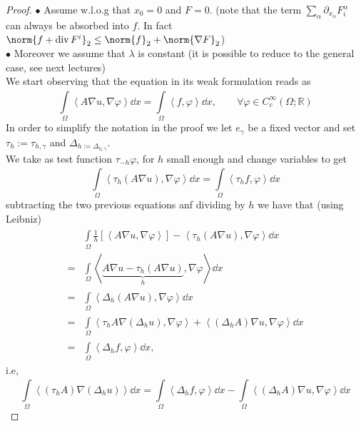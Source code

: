 \begin{proof}
	\( \bullet \)  Assume w.l.o.g that \( x_{0}=0 \) and \( F=0 \). (note that the term \( \sum_{\alpha }^{}\partial_{x_{\alpha }}F_{i}^{\alpha } \) can always be absorbed into \( f \). In fact \( \norm{f+ \operatorname{div}F^{i}}_{2}\leq \norm{f}_{2}+\norm{\nabla F}_{2} \))\\
	\( \bullet \)  Moreover we assume that \( \lambda \) is constant (it is possible to reduce to the general case, see next lectures) \\
	We start observing that the equation in its weak formulation reads as
	\[ \int\limits_{\Omega}^{} \left\langle A \nabla u, \nabla \varphi  \right\rangle  \dd{x} = \int\limits_{\Omega}^{} \left\langle f,\varphi  \right\rangle  \dd{x}, \qquad \forall  \varphi \in  C_{c}^{\infty }(\Omega ; \mathbb{R}) \]
	In order to simplify the notation in the proof we let \( e_{\gamma } \) be a fixed vector and set \( \tau _{h}:= \tau _{h, \gamma  } \) and \( \Delta _{h := \Delta _{h, \gamma }} \).\\
	We take as test function \( \tau _{-h}\varphi  \), for \( h \) small enough and change variables to get
	\[ \int\limits_{\Omega}^{} \left\langle \tau _{h}(A \nabla u), \nabla \varphi  \right\rangle  \dd{x} = \int\limits_{\Omega}^{} \left\langle \tau _{h}f, \varphi  \right\rangle  \dd{x} \]
	subtracting the two previous equations anf dividing by \( h \) we have that (using Leibniz)
	\begin{align}
		  & \int\limits_{\Omega}^{} \frac{1}{h} \left[ \left\langle A \nabla u, \nabla \varphi  \right\rangle  \right]- \left\langle \tau _{h}(A \nabla u), \nabla \varphi  \right\rangle \dd{x}  \\
		= & \int\limits_{\Omega}^{} \left\langle \underbrace{A \nabla u - \tau _{h}(A \nabla u)}_{h}, \nabla \varphi  \right\rangle  \dd{x}  \\
		= & \int\limits_{\Omega}^{} \left\langle \Delta _{h}(A \nabla u), \nabla \varphi  \right\rangle  \dd{x}  \\
		= & \int\limits_{\Omega}^{} \left\langle \tau _{h} A \nabla (\Delta _{h} u), \nabla \varphi \right\rangle  + \left\langle (\Delta _{h}A) \nabla u, \nabla \varphi  \right\rangle \dd{x}  \\
		= & \int\limits_{\Omega}^{} \left\langle \Delta _{h}f, \varphi  \right\rangle  \dd{x},
	\end{align}
	i.e,
	\[ \int\limits_{\Omega}^{} \left\langle (\tau _{h}A) \nabla (\Delta _{h}u)  \right\rangle  \dd{x} = \int\limits_{\Omega}^{} \left\langle \Delta _{h} f, \varphi  \right\rangle  \dd{x} - \int\limits_{\Omega}^{} \left\langle (\Delta _{h}A) \nabla u, \nabla \varphi \right\rangle  \dd{x} \]

\end{proof}
